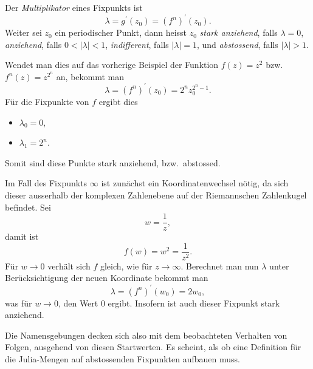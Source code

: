 \begin{definition}
Der \emph{Multiplikator} eines Fixpunkts ist 
%
\begin{equation*}
    \lambda = g^\prime(z_0) = \left(f^n\right)^\prime(z_0).
    \label{julia:lambda_multiplicator}
\end{equation*}
Weiter sei $z_0$ ein periodischer Punkt,
dann heisst $z_0$ \emph{stark anziehend}, falls $\lambda = 0$,
%
\emph{anziehend}, falls $0 < |\lambda| < 1$,
%
\emph{indifferent}, falls $|\lambda| = 1$,
%
und \emph{abstossend}, falls $|\lambda| > 1$.
%
\label{julia:lambda_defs}
\end{definition}

Wendet man dies auf das vorherige Beispiel der Funktion $f(z) = z^2$ bzw. $f^n(z) = z^{2^n}$ an, bekommt man
\begin{equation*}
    \lambda = \left(f^n\right)^\prime(z_0) = 2^n z_0^{2^n - 1}.
\end{equation*}
Für die Fixpunkte von $f$ ergibt dies
\begin{itemize}
    \item $\lambda_0 = 0$,
    \item $\lambda_1 = 2^n$.
\end{itemize}
Somit sind diese Punkte stark anziehend, bzw.~abstossed.

Im Fall des Fixpunkts $\infty$ ist zunächst ein Koordinatenwechsel nötig, da sich dieser ausserhalb der komplexen Zahlenebene auf der Riemannschen Zahlenkugel befindet.
Sei
\begin{equation*}
    w = \frac{1}{z},
\end{equation*}
damit ist
\begin{equation*}
    f(w) = w^2 = \frac{1}{z^2}.
\end{equation*}
Für $w \to 0$ verhält sich $f$ gleich, wie für $z \to \infty$.
Berechnet man nun $\lambda$ unter Berücksichtigung der neuen Koordinate bekommt man
\begin{equation*}
    \lambda = \left(f^n\right)^\prime(w_0) = 2 w_0,
\end{equation*}
was für $w \to 0$, den Wert $0$ ergibt.
Insofern ist auch dieser Fixpunkt stark anziehend.

Die Namensgebungen decken sich also mit dem beobachteten Verhalten von Folgen, ausgehend von diesen Startwerten.
Es scheint, als ob eine Definition für die Julia-Mengen auf abstossenden Fixpunkten aufbauen muss. 

